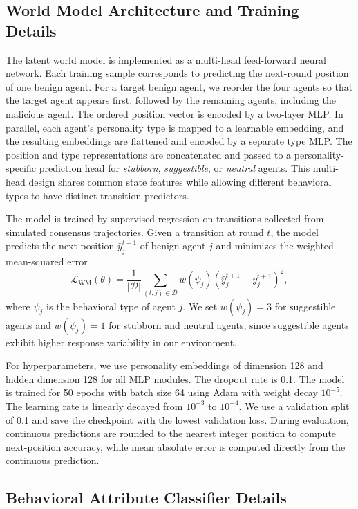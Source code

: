 \documentclass{article}
\theoremstyle{plain}
\theoremstyle{definition}
\theoremstyle{remark}
\begin{document}
\subsection{World Model Architecture and Training Details}
\label{app:world_model_details}

The latent world model is implemented as a multi-head feed-forward neural network. Each training sample corresponds to predicting the next-round position of one benign agent. For a target benign agent, we reorder the four agents so that the target agent appears first, followed by the remaining agents, including the malicious agent. The ordered position vector is encoded by a two-layer MLP. In parallel, each agent's personality type is mapped to a learnable embedding, and the resulting embeddings are flattened and encoded by a separate type MLP. The position and type representations are concatenated and passed to a personality-specific prediction head for \emph{stubborn}, \emph{suggestible}, or \emph{neutral} agents. This multi-head design shares common state features while allowing different behavioral types to have distinct transition predictors.

The model is trained by supervised regression on transitions collected from simulated consensus trajectories. Given a transition at round $t$, the model predicts the next position $\hat{y}_{j}^{t+1}$ of benign agent $j$ and minimizes the weighted mean-squared error
\[
\mathcal{L}_{\mathrm{WM}}(\theta)
=
\frac{1}{|\mathcal{D}|}
\sum_{(t,j)\in\mathcal{D}}
w(\psi_j)
\left(
\hat{y}_{j}^{t+1}
-
y_j^{t+1}
\right)^2,
\]
where $\psi_j$ is the behavioral type of agent $j$. We set $w(\psi_j)=3$ for suggestible agents and $w(\psi_j)=1$ for stubborn and neutral agents, since suggestible agents exhibit higher response variability in our environment.

For hyperparameters, we use personality embeddings of dimension 128 and hidden dimension 128 for all MLP modules. The dropout rate is 0.1. The model is trained for 50 epochs with batch size 64 using Adam with weight decay $10^{-5}$. The learning rate is linearly decayed from $10^{-3}$ to $10^{-4}$. We use a validation split of 0.1 and save the checkpoint with the lowest validation loss. During evaluation, continuous predictions are rounded to the nearest integer position to compute next-position accuracy, while mean absolute error is computed directly from the continuous prediction.

\subsection{Behavioral Attribute Classifier Details}
\label{app:attribute_classifier_details}
\end{document}
